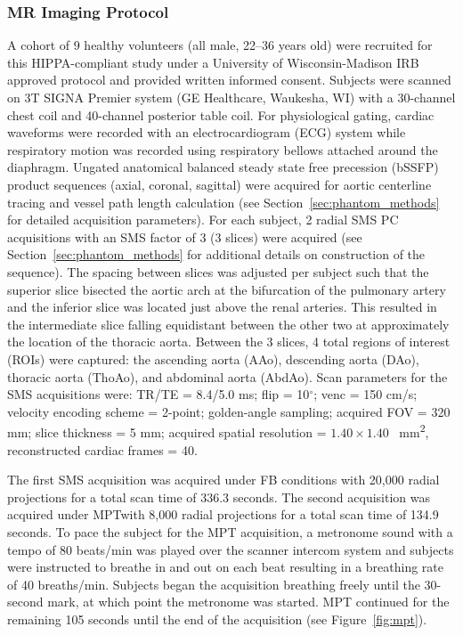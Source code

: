 \subsubsection{MR Imaging Protocol}
A cohort of 9 healthy volunteers (all male, 22--36 years old) were recruited for this HIPPA-compliant study under a University of Wisconsin-Madison IRB approved protocol and provided written informed consent. Subjects were scanned on 3T SIGNA Premier system (GE Healthcare, Waukesha, WI) with a 30-channel chest coil and 40-channel posterior table coil. For physiological gating, cardiac waveforms were recorded with an electrocardiogram (ECG) system while respiratory motion was recorded using respiratory bellows attached around the diaphragm. Ungated anatomical balanced steady state free precession (bSSFP) product sequences (axial, coronal, sagittal) were acquired for aortic centerline tracing and vessel path length calculation (see Section~\ref{sec:phantom_methods} for detailed acquisition parameters). For each subject, 2 radial SMS PC acquisitions with an SMS factor of 3 (3 slices) were acquired (see Section~\ref{sec:phantom_methods} for additional details on construction of the sequence). The spacing between slices was adjusted per subject such that the superior slice bisected the aortic arch at the bifurcation of the pulmonary artery and the inferior slice was located just above the renal arteries. This resulted in the intermediate slice falling equidistant between the other two at approximately the location of the thoracic aorta. Between the 3 slices, 4 total regions of interest (ROIs) were captured: the ascending aorta (AAo), descending aorta (DAo), thoracic aorta (ThoAo), and abdominal aorta (AbdAo). Scan parameters for the SMS acquisitions were: TR/TE = 8.4/5.0 ms; flip = 10$^\circ$; venc = 150 cm/s; velocity encoding scheme = 2-point; golden-angle sampling; acquired FOV = 320 mm; slice thickness = 5 mm; acquired spatial resolution = $1.40 \times 1.40$ \qty{}{\mm^2}, reconstructed cardiac frames = 40.

The first SMS acquisition was acquired under FB conditions with 20,000 radial projections for a total scan time of 336.3 seconds. The second acquisition was acquired under MPT\@ with 8,000 radial projections for a total scan time of 134.9 seconds. To pace the subject for the MPT acquisition, a metronome sound with a tempo of 80 beats/min was played over the scanner intercom system and subjects were instructed to breathe in and out on each beat resulting in a breathing rate of 40 breaths/min. Subjects began the acquisition breathing freely until the 30-second mark, at which point the metronome was started. MPT continued for the remaining 105 seconds until the end of the acquisition (see Figure~\ref{fig:mpt}). 

